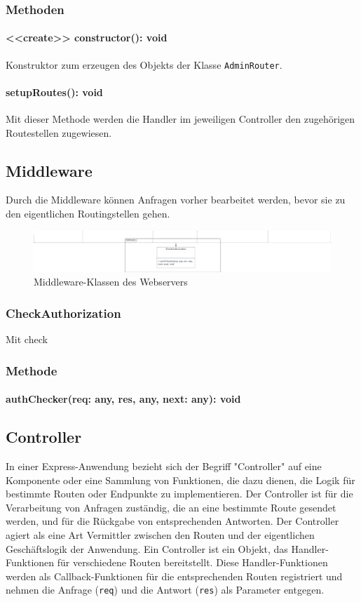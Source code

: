 \documentclass[parskip=full]{scrartcl}
\begin{document}
\subsubsection*{Methoden}
\paragraph{<<create>> constructor(): void}Konstruktor zum erzeugen des Objekts der Klasse \texttt{AdminRouter}.
\paragraph{setupRoutes(): void}Mit dieser Methode werden die Handler im jeweiligen Controller den zugehörigen Routestellen zugewiesen.

\subsection{Middleware}
Durch die Middleware können Anfragen vorher bearbeitet werden, bevor sie zu den eigentlichen Routingstellen gehen.

\begin{figure}[htp]
    \centering
    \includegraphics[width = 1\textwidth]{images/webserver/middleware.pdf}
    \caption{Middleware-Klassen des Webservers}
    \label{fig:middleware}
\end{figure}

\subsubsection{CheckAuthorization}
Mit check
\subsubsection*{Methode}
\paragraph{authChecker(req: any, res, any, next: any): void}

\subsection{Controller}
In einer Express-Anwendung bezieht sich der Begriff "Controller" auf eine Komponente oder eine Sammlung von Funktionen, die dazu dienen, die Logik für bestimmte Routen oder Endpunkte zu implementieren.
Der Controller ist für die Verarbeitung von Anfragen zuständig, die an eine bestimmte Route gesendet werden, und für die Rückgabe von entsprechenden Antworten.
Der Controller agiert als eine Art Vermittler zwischen den Routen und der eigentlichen Geschäftslogik der Anwendung.
Ein Controller ist ein Objekt, das Handler-Funktionen für verschiedene Routen bereitstellt.
Diese Handler-Funktionen werden als Callback-Funktionen für die entsprechenden Routen registriert und nehmen die Anfrage (\texttt{req}) und die Antwort (\texttt{res}) als Parameter entgegen.
\end{document}
